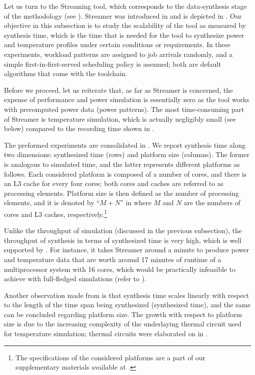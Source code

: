 
Let us turn to the Streaming tool, which corresponds to the data-synthesis stage
of the methodology (see ). Streamer was introduced in
 and is depicted in . Our objective in this
subsection is to study the scalability of the tool as measured by synthesis
time, which is the time that is needed for the tool to synthesize power and
temperature profiles under certain conditions or requirements. In these
experiments, workload patterns are assigned to job arrivals randomly, and a
simple first-in-first-served scheduling policy is assumed; both are default
algorithms that come with the toolchain.

Before we proceed, let us reiterate that, as far as Streamer is concerned, the
expense of performance and power simulation is essentially zero as the tool
works with precomputed power data (power patterns). The most time-consuming part
of Streamer is temperature simulation, which is actually negligibly small (see
below) compared to the recording time shown in .

The preformed experiments are consolidated in . We report
synthesis time along two dimensions: synthesized time (rows) and platform size
(columns). The former is analogous to simulated time, and the latter represents
different platforms as follows. Each considered platform is composed of a number
of cores, and there is an L3 cache for every four cores; both cores and caches
are referred to as processing elements. Platform size is then defined as the
number of processing elements, and it is denoted by ``$M + N$'' in
 where $M$ and $N$ are the numbers of cores and L3 caches,
respectively.\footnote{The specifications of the considered platforms are a part
of our supplementary materials available at \cite{sources}.}

Unlike the throughput of simulation (discussed in the previous subsection), the
throughput of synthesis in terms of synthesized time is very high, which is well
supported by . For instance, it takes Streamer around a minute
to produce power and temperature data that are worth around 17 minutes of
runtime of a multiprocessor system with 16 cores, which would be practically
infeasible to achieve with full-fledged simulations (refer to ).

Another observation made from  is that synthesis time scales
linearly with respect to the length of the time span being synthesized
(synthesized time), and the same can be concluded regarding platform size. The
growth with respect to platform size is due to the increasing complexity of the
underlaying thermal  circuit used for temperature simulation; thermal
circuits were elaborated on in .
